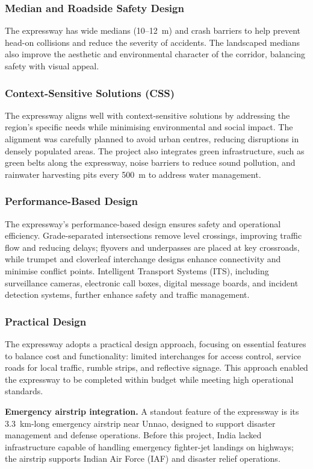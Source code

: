 \documentclass[11pt]{article}
\begin{document}
\subsubsection{Median and Roadside Safety Design}
The expressway has wide medians (10--12~m) and crash barriers to help prevent head-on collisions and
reduce the severity of accidents. The landscaped medians also improve the aesthetic and environmental
character of the corridor, balancing safety with visual appeal.

\subsubsection{Context-Sensitive Solutions (CSS)}
The expressway aligns well with context-sensitive solutions by addressing the region's specific needs
while minimising environmental and social impact. The alignment was carefully planned to avoid urban
centres, reducing disruptions in densely populated areas. The project also integrates green
infrastructure, such as green belts along the expressway, noise barriers to reduce sound pollution, and
rainwater harvesting pits every 500~m to address water management.

\subsubsection{Performance-Based Design}
The expressway's performance-based design ensures safety and operational efficiency. Grade-separated
intersections remove level crossings, improving traffic flow and reducing delays; flyovers and
underpasses are placed at key crossroads, while trumpet and cloverleaf interchange designs enhance
connectivity and minimise conflict points. Intelligent Transport Systems (ITS), including surveillance
cameras, electronic call boxes, digital message boards, and incident detection systems, further enhance
safety and traffic management.

\subsubsection{Practical Design}
The expressway adopts a practical design approach, focusing on essential features to balance cost and
functionality: limited interchanges for access control, service roads for local traffic, rumble strips,
and reflective signage. This approach enabled the expressway to be completed within budget while
meeting high operational standards.

\textbf{Emergency airstrip integration.} A standout feature of the expressway is its 3.3~km-long
emergency airstrip near Unnao, designed to support disaster management and defense operations. Before
this project, India lacked infrastructure capable of handling emergency fighter-jet landings on
highways; the airstrip supports Indian Air Force (IAF) and disaster relief operations.
\end{document}
